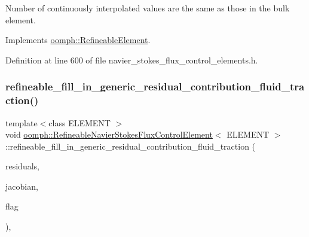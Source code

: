 Number of continuously interpolated values are the same as those in the bulk element. 



Implements \hyperlink{classoomph_1_1RefineableElement_a53e171a18c9f43f1db90a6876516a073}{oomph\+::\+Refineable\+Element}.



Definition at line 600 of file navier\+\_\+stokes\+\_\+flux\+\_\+control\+\_\+elements.\+h.

\mbox{\label{classoomph_1_1RefineableNavierStokesFluxControlElement_a74cf9a3dc75276ce2eaefe6b8255811f}} 
\subsubsection{\texorpdfstring{refineable\+\_\+fill\+\_\+in\+\_\+generic\+\_\+residual\+\_\+contribution\+\_\+fluid\+\_\+traction()}{refineable\_fill\_in\_generic\_residual\_contribution\_fluid\_traction()}}
{\footnotesize\ttfamily template$<$class E\+L\+E\+M\+E\+NT $>$ \\
void \hyperlink{classoomph_1_1RefineableNavierStokesFluxControlElement}{oomph\+::\+Refineable\+Navier\+Stokes\+Flux\+Control\+Element}$<$ E\+L\+E\+M\+E\+NT $>$\+::refineable\+\_\+fill\+\_\+in\+\_\+generic\+\_\+residual\+\_\+contribution\+\_\+fluid\+\_\+traction (\begin{DoxyParamCaption}\item[{\hyperlink{classoomph_1_1Vector}{Vector}$<$ double $>$ \&}]{residuals,  }\item[{\hyperlink{classoomph_1_1DenseMatrix}{Dense\+Matrix}$<$ double $>$ \&}]{jacobian,  }\item[{unsigned}]{flag }\end{DoxyParamCaption})\hspace{0.3cm}{\ttfamily [inline]}, {\ttfamily [protected]}}



